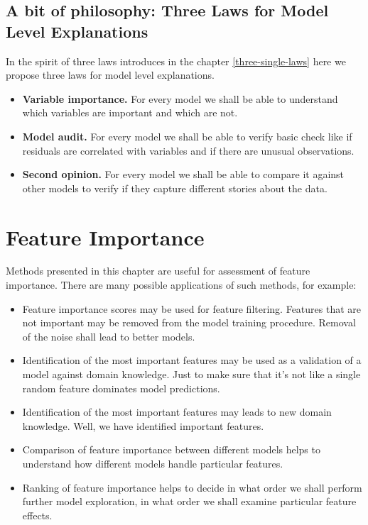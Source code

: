 \documentclass[12pt,]{krantz}
\providecommand{\tightlist}{%
  \setlength{\itemsep}{0pt}\setlength{\parskip}{0pt}}
\theoremstyle{definition}
\theoremstyle{definition}
\theoremstyle{definition}
\theoremstyle{remark}
\begin{document}
\hypertarget{a-bit-of-philosophy-three-laws-for-model-level-explanations}{%
\subsection{A bit of philosophy: Three Laws for Model Level
Explanations}\label{a-bit-of-philosophy-three-laws-for-model-level-explanations}}

In the spirit of three laws introduces in the chapter
\ref{three-single-laws} here we propose three laws for model level
explanations.

\begin{itemize}
\tightlist
\item
  \textbf{Variable importance.} For every model we shall be able to
  understand which variables are important and which are not.
\item
  \textbf{Model audit.} For every model we shall be able to verify basic
  check like if residuals are correlated with variables and if there are
  unusual observations.
\item
  \textbf{Second opinion.} For every model we shall be able to compare
  it against other models to verify if they capture different stories
  about the data.
\end{itemize}

\hypertarget{featureImportance}{%
\section{Feature Importance}\label{featureImportance}}

Methods presented in this chapter are useful for assessment of feature
importance. There are many possible applications of such methods, for
example:

\begin{itemize}
\tightlist
\item
  Feature importance scores may be used for feature filtering. Features
  that are not important may be removed from the model training
  procedure. Removal of the noise shall lead to better models.
\item
  Identification of the most important features may be used as a
  validation of a model against domain knowledge. Just to make sure that
  it's not like a single random feature dominates model predictions.
\item
  Identification of the most important features may leads to new domain
  knowledge. Well, we have identified important features.
\item
  Comparison of feature importance between different models helps to
  understand how different models handle particular features.
\item
  Ranking of feature importance helps to decide in what order we shall
  perform further model exploration, in what order we shall examine
  particular feature effects.
\end{itemize}
\end{document}
